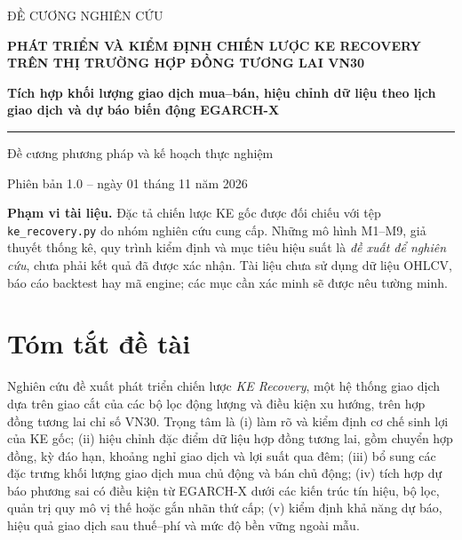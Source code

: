 \documentclass[12pt,a4paper,oneside]{article}
\begin{document}
\begin{titlepage}
\centering
\vspace*{1.8cm}
{\sffamily\large ĐỀ CƯƠNG NGHIÊN CỨU\par}
\vspace{1.2cm}
{\Huge\bfseries\color{primary} PHÁT TRIỂN VÀ KIỂM ĐỊNH CHIẾN LƯỢC KE RECOVERY TRÊN THỊ TRƯỜNG HỢP ĐỒNG TƯƠNG LAI VN30\par}
\vspace{0.65cm}
{\Large\bfseries\color{primary} Tích hợp khối lượng giao dịch mua--bán, hiệu chỉnh dữ liệu theo lịch giao dịch và dự báo biến động EGARCH-X\par}
\vspace{1cm}
\rule{0.77\linewidth}{0.9pt}\par
\vspace{0.8cm}
{\large\sffamily Đề cương phương pháp và kế hoạch thực nghiệm\par}
\vspace{0.3cm}
{\normalsize Phiên bản 1.0 -- ngày 01 tháng 11 năm 2026\par}
\vfill
\begin{minipage}{0.85\linewidth}
\small
\textbf{Phạm vi tài liệu.} Đặc tả chiến lược KE gốc được đối chiếu với tệp \texttt{ke\_recovery.py} do nhóm nghiên cứu cung cấp. Những mô hình M1--M9, giả thuyết thống kê, quy trình kiểm định và mục tiêu hiệu suất là \emph{đề xuất để nghiên cứu}, chưa phải kết quả đã được xác nhận. Tài liệu chưa sử dụng dữ liệu OHLCV, báo cáo backtest hay mã engine; các mục cần xác minh sẽ được nêu tường minh.
\end{minipage}
\vspace{1.2cm}
\end{titlepage}
\tableofcontents
\clearpage
{}

\section{Tóm tắt đề tài}
Nghiên cứu đề xuất phát triển chiến lược \textit{KE Recovery}, một hệ thống giao dịch dựa trên giao cắt của các bộ lọc động lượng và điều kiện xu hướng, trên hợp đồng tương lai chỉ số VN30. Trọng tâm là (i) làm rõ và kiểm định cơ chế sinh lợi của KE gốc; (ii) hiệu chỉnh đặc điểm dữ liệu hợp đồng tương lai, gồm chuyển hợp đồng, kỳ đáo hạn, khoảng nghỉ giao dịch và lợi suất qua đêm; (iii) bổ sung các đặc trưng khối lượng giao dịch mua chủ động và bán chủ động; (iv) tích hợp dự báo phương sai có điều kiện từ EGARCH-X dưới các kiến trúc tín hiệu, bộ lọc, quản trị quy mô vị thế hoặc gắn nhãn thứ cấp; (v) kiểm định khả năng dự báo, hiệu quả giao dịch sau thuế--phí và mức độ bền vững ngoài mẫu.
\end{document}
